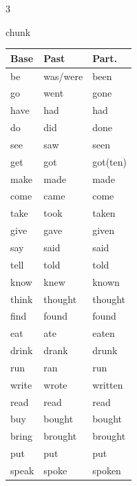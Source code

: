 \documentclass[10pt,a4paper,landscape]{article}
\begin{document}
\begin{multicols}{3}
\begin{cajaseccion}{chunk}
{\scriptsize
\begin{tabularx}{\linewidth}{@{} l l l @{}}
\toprule
\textbf{Base} & \textbf{Past} & \textbf{Part.} \\
\midrule
be & was/were & been \\
go & went & gone \\
have & had & had \\
do & did & done \\
see & saw & seen \\
get & got & got(ten) \\
make & made & made \\
come & came & come \\
take & took & taken \\
give & gave & given \\
say & said & said \\
tell & told & told \\
know & knew & known \\
think & thought & thought \\
find & found & found \\
eat & ate & eaten \\
drink & drank & drunk \\
run & ran & run \\
write & wrote & written \\
read & read & read \\
buy & bought & bought \\
bring & brought & brought \\
put & put & put \\
speak & spoke & spoken \\
\bottomrule
\end{tabularx}
}
\end{cajaseccion}

\vspace{0.2cm}


\end{multicols}
\end{document}
